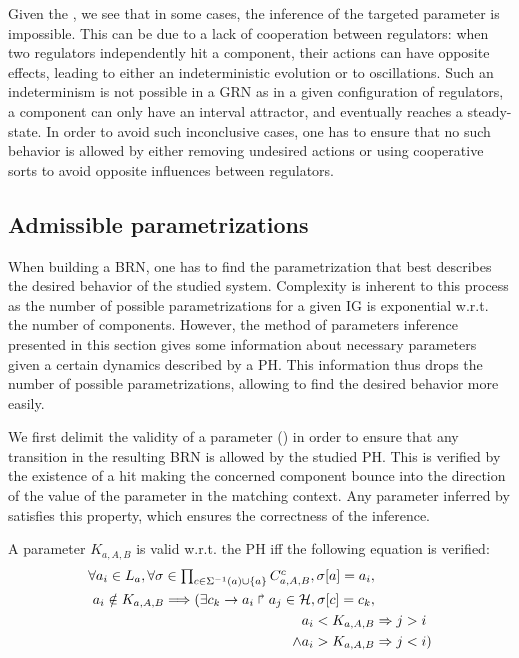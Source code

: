 Given the , we see that in some cases, the inference of the targeted parameter is impossible.
This can be due to a lack of cooperation between regulators: when two regulators independently hit a component, their actions can have opposite effects, leading to either an indeterministic evolution or to oscillations.
Such an indeterminism is not possible in a GRN as in a given configuration of regulators, a component can only have an interval attractor, and eventually reaches a steady-state.
In order to avoid such inconclusive cases, one has to ensure that no such behavior is allowed by
either removing undesired actions or using cooperative sorts to avoid opposite influences between
regulators.

\subsection{Admissible parametrizations}\label{ssec:admissible-K}

When building a BRN, one has to find the parametrization that best describes the desired behavior of the studied system.
Complexity is inherent to this process as the number of possible parametrizations for a given IG is exponential w.r.t. the number of components.
However, the method of parameters inference presented in this section gives some information about necessary parameters given a certain dynamics described by a PH.
This information thus drops the number of possible parametrizations, allowing to find the desired behavior more easily.

We first delimit the validity of a parameter () in order to ensure that any
transition in the resulting BRN is allowed by the studied PH.
This is verified by the existence of a hit making the concerned component bounce into the direction
of the value of the parameter in the matching context.
Any parameter inferred by  satisfies this property, which ensures the correctness
of the inference.

\begin{property}\label{pro:K-valid}
A parameter $K_{a,A,B}$ is valid w.r.t. the PH iff the following equation is verified:
\begin{align*}
\forall a_i\in L_a, \forall \sigma\in \textstyle\prod_{c\in\Sigma^{-1}(a) \cup \{a\}} C^c_{a,A,B},
	\sigma[a] = a_i,  & \\
		a_i \notin K_{a,A,B} \Longrightarrow (
  \exists c_k\rightarrow a_i\Rsh a_j\in\mathcal{H}, \sigma[c] = c_k, & \\
 \qquad a_i < K_{a,A,B} & \Rightarrow j > i  \\
 \qquad \wedge a_i > K_{a,A,B} & \Rightarrow j <i )
\end{align*}
\end{property}
		

